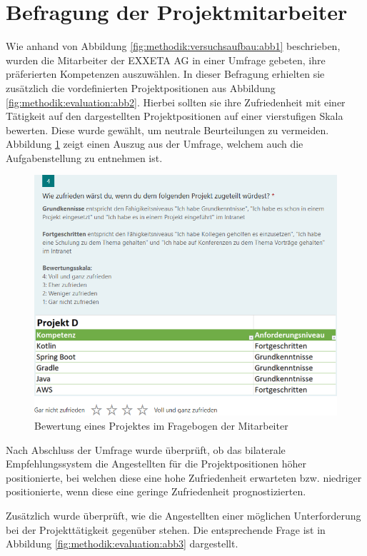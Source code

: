 \section{Befragung der Projektmitarbeiter}
\label{ch:methodik:evaluation:mitarbeiter}
Wie anhand von Abbildung \ref{fig:methodik:versuchsaufbau:abb1} beschrieben, wurden die Mitarbeiter der EXXETA AG in einer Umfrage gebeten, ihre präferierten Kompetenzen auszuwählen. In dieser Befragung erhielten sie zusätzlich die vordefinierten Projektpositionen aus Abbildung \ref{fig:methodik:evaluation:abb2}. Hierbei sollten sie ihre Zufriedenheit mit einer Tätigkeit auf den dargestellten Projektpositionen auf einer vierstufigen Skala bewerten. Diese wurde gewählt, um neutrale Beurteilungen zu vermeiden. Abbildung \ref{fig:methodik:evaluation:abb1} zeigt einen Auszug aus der Umfrage, welchem auch die Aufgabenstellung zu entnehmen ist.

\begin{figure}[h]
	\centering
	\includegraphics[width=1\textwidth]{gfx/projekt-umfrage.png}
	\caption{Bewertung eines Projektes im Fragebogen der Mitarbeiter}
	\label{fig:methodik:evaluation:abb1}
\end{figure}

Nach Abschluss der Umfrage wurde überprüft, ob das bilaterale Empfehlungssystem die Angestellten für die Projektpositionen höher positionierte, bei welchen diese eine hohe Zufriedenheit erwarteten bzw. niedriger positionierte, wenn diese eine geringe Zufriedenheit prognostizierten.

Zusätzlich wurde überprüft, wie die Angestellten einer möglichen Unterforderung bei der Projekttätigkeit gegenüber stehen. Die entsprechende Frage ist in Abbildung \ref{fig:methodik:evaluation:abb3} dargestellt.

